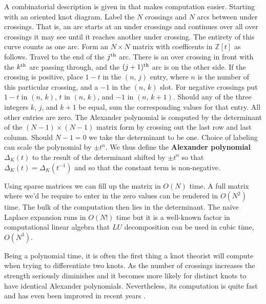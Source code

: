     A combinatorial description is given in
    \cite[p.~49]{LivingstonKnotTheory} that makes computation easier. Starting
    with an oriented knot diagram. Label the $N$ crossings and $N$ arcs
    between under crossings. That is, an arc starts at an under crossings and
    continues over all over crossings it may see until it reaches another
    under crossing. The entirety of this curve counts as one arc.
    Form an $N\times{N}$ matrix with coefficents in $\mathbb{Z}[t]$
    as follows. Travel to the end of the $j^{\small\textrm{th}}$ arc.
    There is an over crossing in front with the $k^{\small\textrm{th}}$
    arc passing through, and the $(j+1)^{\small\textrm{th}}$ arc is on the
    other side. If the crossing is positive, place $1-t$ in the
    $(n,\,j)$ entry, where $n$ is the number of this particular crossing,
    and a $-1$ in the $(n,\,k)$ slot. For negative crossings put
    $1-t$ in $(n,\,k)$, $t$ in $(n,\,k)$, and
    $-1$ in $(n,\,k+1)$. Should any of the three integers $k$, $j$, and $k+1$
    be equal, sum the corresponding values for that entry. All other entries
    are zero. The Alexander polynomial is computed by the
    determinant of the $(N-1)\times(N-1)$ matrix form by crossing out the
    last row and last column. Should $N-1=0$ we take the determinant to be
    one. Choice of labeling can scale the polynomial by $\pm{t}^{n}$. We thus
    define the \textbf{Alexander polynomial} $\Delta_{K}(t)$ to the result of
    the determinant shifted by $\pm{t}^{n}$ so that
    $\Delta_{K}(t)=\Delta_{K}(t^{-1})$ and so that the constant term is
    non-negative.
    \par\hfill\par
    Using sparse matrices we can fill up the matrix in $O(N)$ time. A full
    matrix where we'd be require to enter in the zero values can be rendered
    in $O(N^{2})$ time. The bulk of the computation then lies in the
    determinant. The na\"{i}ve Laplace expansion runs in $O(N!)$ time but it
    is a well-known factor in computational linear algebra that $LU$
    decomposition can be used in cubic time, $O(N^{3})$.
    \par\hfill\par
    Being a polynomial time, it is often the first thing a knot theorist will
    compute when trying to differentiate two knots. As the number of crossings
    increases the strength seriously diminishes and it becomes more likely
    for distinct knots to have identical Alexander polynomials. Nevertheless,
    its computation is quite fast and has even been improved in recent years
    \cite{BarNatanPolynomialTimeKnotPolynomials}.
